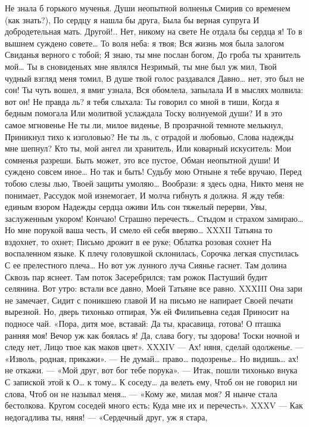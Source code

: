 Не знала б горького мученья.
Души неопытной волненья
Смирив со временем (как знать?),
По сердцу я нашла бы друга,
Была бы верная супруга
И добродетельная мать.
Другой!.. Нет, никому на свете
Не отдала бы сердца я!
То в вышнем суждено совете…
То воля неба: я твоя;
Вся жизнь моя была залогом
Свиданья верного с тобой;
Я знаю, ты мне послан богом,
До гроба ты хранитель мой…
Ты в сновиденьях мне являлся
Незримый, ты мне был уж мил,
Твой чудный взгляд меня томил,
В душе твой голос раздавался
Давно… нет, это был не сон!
Ты чуть вошел, я вмиг узнала,
Вся обомлела, запылала
И в мыслях молвила: вот он!
Не правда ль? я тебя слыхала:
Ты говорил со мной в тиши,
Когда я бедным помогала
Или молитвой услаждала
Тоску волнуемой души?
И в это самое мгновенье
Не ты ли, милое виденье,
В прозрачной темноте мелькнул,
Приникнул тихо к изголовью?
Не ты ль, с отрадой и любовью,
Слова надежды мне шепнул?
Кто ты, мой ангел ли хранитель,
Или коварный искуситель:
Мои сомненья разреши.
Быть может, это все пустое,
Обман неопытной души!
И суждено совсем иное…
Но так и быть! Судьбу мою
Отныне я тебе вручаю,
Перед тобою слезы лью,
Твоей защиты умоляю…
Вообрази: я здесь одна,
Никто меня не понимает,
Рассудок мой изнемогает,
И молча гибнуть я должна.
Я жду тебя: единым взором
Надежды сердца оживи
Иль сон тяжелый перерви,
Увы, заслуженным укором!
Кончаю! Страшно перечесть…
Стыдом и страхом замираю…
Но мне порукой ваша честь,
И смело ей себя вверяю…
XXXII
Татьяна то вздохнет, то охнет;
Письмо дрожит в ее руке;
Облатка розовая сохнет
На воспаленном языке.
К плечу головушкой склонилась,
Сорочка легкая спустилась
С ее прелестного плеча…
Но вот уж лунного луча
Сиянье гаснет. Там долина
Сквозь пар яснеет. Там поток
Засеребрился; там рожок
Пастуший будит селянина.
Вот утро: встали все давно,
Моей Татьяне все равно.
XXXIII
Она зари не замечает,
Сидит с поникшею главой
И на письмо не напирает
Своей печати вырезной.
Но, дверь тихонько отпирая,
Уж ей Филипьевна седая
Приносит на подносе чай.
«Пора, дитя мое, вставай:
Да ты, красавица, готова!
О пташка ранняя моя!
Вечор уж как боялась я!
Да, слава богу, ты здорова!
Тоски ночной и следу нет,
Лицо твое как маков цвет».
XXXIV
— Ах! няня, сделай одолженье. —
«Изволь, родная, прикажи».
— Не думай… право… подозренье…
Но видишь… ах! не откажи. —
«Мой друг, вот бог тебе порука».
— Итак, пошли тихонько внука
С запиской этой к О… к тому…
К соседу… да велеть ему,
Чтоб он не говорил ни слова,
Чтоб он не называл меня… —
«Кому же, милая моя?
Я нынче стала бестолкова.
Кругом соседей много есть;
Куда мне их и перечесть».
XXXV
— Как недогадлива ты, няня! —
«Сердечный друг, уж я стара,

